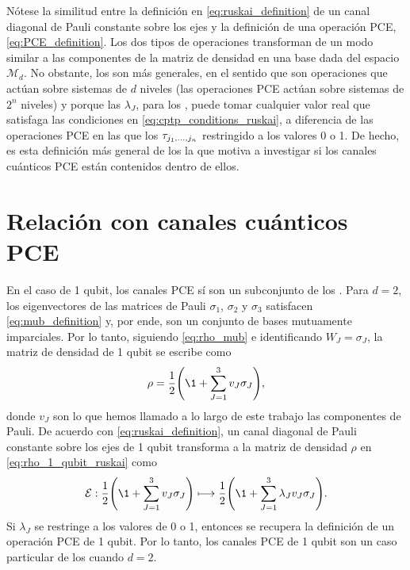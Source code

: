 Nótese la similitud entre la definición en \eqref{eq:ruskai_definition} 
de un canal diagonal de Pauli constante
sobre los ejes y la definición de una operación PCE, \eqref{eq:PCE_definition}.
Los dos tipos de operaciones transforman de 
un modo similar a las componentes de la matriz de densidad en una 
base dada del espacio $\mathcal{M}_d$.
No obstante, los \ruskai{} son más generales, en el sentido que son
operaciones que actúan sobre sistemas de $d$ niveles (las 
operaciones PCE actúan sobre sistemas de $2^n$ niveles) y porque 
las $\lambda_J$, para los \ruskai{}, puede tomar cualquier valor real que 
satisfaga las condiciones en \eqref{eq:cptp_conditions_ruskai}, a diferencia
de las operaciones PCE en las que los $\tau_{j_1,\ldots ,j_n}$ restringido a los valores 0 o 1.
De hecho, es esta definición más general de los \ruskai{} la que motiva a
investigar si los canales cuánticos PCE están contenidos dentro de ellos.

\section{Relación con canales cuánticos PCE} \label{sec:ch4_PCEnotRuskai}%

En el caso de 1 qubit, los canales PCE sí son un subconjunto de los \ruskai{}. Para $d=2$,
los eigenvectores de las matrices de Pauli $\sigma_1$, $\sigma_2$ y $\sigma_3$ 
satisfacen \eqref{eq:mub_definition} y, por ende, son un conjunto 
de bases mutuamente imparciales. Por lo tanto, siguiendo \eqref{eq:rho_mub}
e identificando $W_J=\sigma_J$, la matriz de densidad de 1 qubit se escribe como
\begin{align} \label{eq:rho_1_qubit_ruskai}
	\rho=\frac{1}{2}\qty(\1+\sum_{J=1}^3v_J\sigma_J),
\end{align}
donde $v_J$ son lo que hemos llamado a lo largo de este trabajo 
las componentes de Pauli.
De acuerdo con \eqref{eq:ruskai_definition}, 
un canal diagonal de Pauli constante sobre los ejes de 1 qubit transforma 
a la matriz de densidad $\rho$ en \eqref{eq:rho_1_qubit_ruskai} como
\begin{align}
	\E :  \frac{1}{2}\qty(\1+\sum_{J=1}^3v_J\sigma_J)
	\longmapsto 
	\frac{1}{2}\qty(\1+\sum_{J=1}^3\lambda_J v_J\sigma_J).
\end{align}
Si $\lambda_J$ se restringe a los valores de 0 o 1, entonces se recupera 
la definición de un operación PCE de 1 qubit. Por lo tanto, los canales PCE 
de 1 qubit son un caso particular de los \ruskai{} cuando $d=2$.

